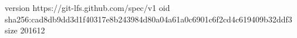 version https://git-lfs.github.com/spec/v1
oid sha256:cad8db9dd3d1f40317e8b243984d80a04a61a0c6901c6f2cd4c619409b32ddf3
size 201612
